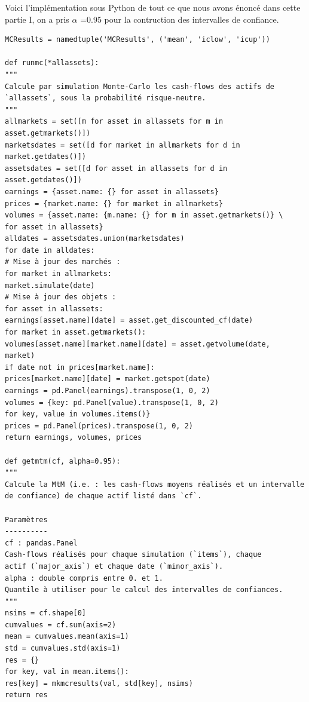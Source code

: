 \documentclass[12pt]{report}
\begin{document}
Voici l’implémentation sous Python de tout ce que nous avons énoncé dans cette partie I, on a pris  $\alpha$ =0.95 pour la contruction des intervalles de confiance.
\begin{verbatim}
MCResults = namedtuple('MCResults', ('mean', 'iclow', 'icup'))

def runmc(*allassets):
"""
Calcule par simulation Monte-Carlo les cash-flows des actifs de
`allassets`, sous la probabilité risque-neutre.
"""
allmarkets = set([m for asset in allassets for m in asset.getmarkets()])
marketsdates = set([d for market in allmarkets for d in market.getdates()])
assetsdates = set([d for asset in allassets for d in asset.getdates()])
earnings = {asset.name: {} for asset in allassets}
prices = {market.name: {} for market in allmarkets}
volumes = {asset.name: {m.name: {} for m in asset.getmarkets()} \
for asset in allassets}
alldates = assetsdates.union(marketsdates)
for date in alldates:
# Mise à jour des marchés :
for market in allmarkets:
market.simulate(date)
# Mise à jour des objets :
for asset in allassets:
earnings[asset.name][date] = asset.get_discounted_cf(date)
for market in asset.getmarkets():
volumes[asset.name][market.name][date] = asset.getvolume(date,
market)
if date not in prices[market.name]:
prices[market.name][date] = market.getspot(date)
earnings = pd.Panel(earnings).transpose(1, 0, 2)
volumes = {key: pd.Panel(value).transpose(1, 0, 2)
for key, value in volumes.items()}
prices = pd.Panel(prices).transpose(1, 0, 2)
return earnings, volumes, prices

def getmtm(cf, alpha=0.95):
"""
Calcule la MtM (i.e. : les cash-flows moyens réalisés et un intervalle
de confiance) de chaque actif listé dans `cf`.

Paramètres
----------
cf : pandas.Panel
Cash-flows réalisés pour chaque simulation (`items`), chaque
actif (`major_axis`) et chaque date (`minor_axis`).
alpha : double compris entre 0. et 1.
Quantile à utiliser pour le calcul des intervalles de confiances.
"""
nsims = cf.shape[0]
cumvalues = cf.sum(axis=2)
mean = cumvalues.mean(axis=1)
std = cumvalues.std(axis=1)
res = {}
for key, val in mean.items():
res[key] = mkmcresults(val, std[key], nsims)
return res

\end{verbatim}
\end{document}
